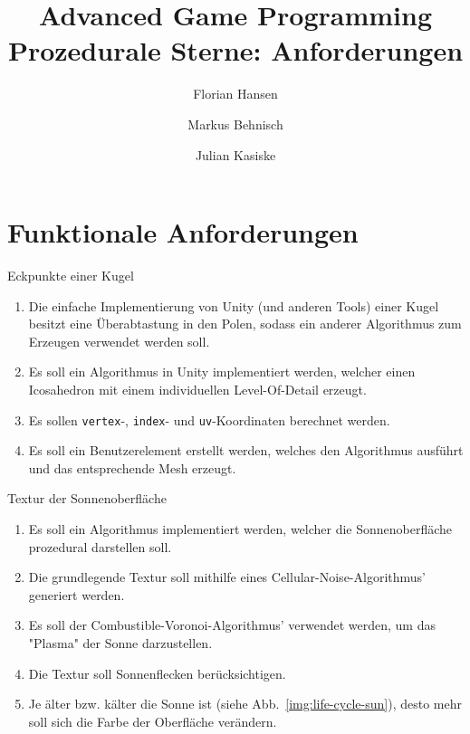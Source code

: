 \documentclass{article}
\title{
  \Huge Advanced Game Programming \\
  \vspace{0.4cm}
  \large Prozedurale Sterne: Anforderungen
}
\author{
  Florian Hansen \and
  Markus Behnisch \and
  Julian Kasiske
}
\begin{document}
  \maketitle

  \section{Funktionale Anforderungen}
  \begin{enumerate}

    \vspace{0.5cm}

    {\bfseries\large\item Eckpunkte einer Kugel}
    \begin{enumerate}
      \item Die einfache Implementierung von Unity (und anderen Tools) einer
        Kugel besitzt eine Überabtastung in den Polen, sodass ein anderer
        Algorithmus zum Erzeugen verwendet werden soll.
      \item Es soll ein Algorithmus in Unity implementiert werden, welcher einen
        Icosahedron mit einem individuellen Level-Of-Detail erzeugt.
      \item Es sollen \texttt{vertex}-, \texttt{index}- und
        \texttt{uv}-Koordinaten berechnet werden.
      \item Es soll ein Benutzerelement erstellt werden, welches den Algorithmus
        ausführt und das entsprechende Mesh erzeugt.
    \end{enumerate}

    \vspace{0.5cm}

    {\bfseries\large\item Textur der Sonnenoberfläche}
    \begin{enumerate}
      \item Es soll ein Algorithmus implementiert werden, welcher die
        Sonnenoberfläche prozedural darstellen soll.
      \item Die grundlegende Textur soll mithilfe eines
        Cellular-Noise-Al\-go\-rith\-mus' generiert werden.
      \item Es soll der Combustible-Voronoi-Algorithmus' verwendet
        werden, um das "Plasma" der Sonne darzustellen.
      \item Die Textur soll Sonnenflecken berücksichtigen.
      \item Je älter bzw. kälter die Sonne ist (siehe
        Abb.~\ref{img:life-cycle-sun}), desto mehr soll sich die Farbe der
        Oberfläche verändern.
    \end{enumerate}


\end{enumerate}
\end{document}
